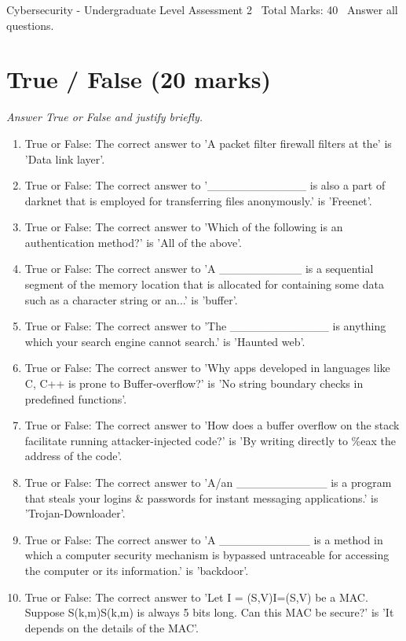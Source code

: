 \documentclass[12pt]{article}
\begin{document}
\begin{center}
Cybersecurity - Undergraduate Level Assessment 2 \
Total Marks: 40 \
Answer all questions.
\end{center}

\section*{True / False (20 marks)}
\textit{Answer True or False and justify briefly.}
\begin{enumerate}[label=\arabic*.]
\item True or False: The correct answer to 'A packet filter firewall filters at the' is 'Data link layer'.
\item True or False: The correct answer to '\_\_\_\_\_\_\_\_\_\_\_\_ is also a part of darknet that is employed for transferring files anonymously.' is 'Freenet'.
\item True or False: The correct answer to 'Which of the following is an authentication method?' is 'All of the above'.
\item True or False: The correct answer to 'A \_\_\_\_\_\_\_\_\_\_ is a sequential segment of the memory location that is allocated for containing some data such as a character string or an...' is 'buffer'.
\item True or False: The correct answer to 'The \_\_\_\_\_\_\_\_\_\_\_\_ is anything which your search engine cannot search.' is 'Haunted web'.
\item True or False: The correct answer to 'Why apps developed in languages like C, C++ is prone to Buffer-overflow?' is 'No string boundary checks in predefined functions'.
\item True or False: The correct answer to 'How does a buffer overflow on the stack facilitate running attacker-injected code?' is 'By writing directly to \%eax the address of the code'.
\item True or False: The correct answer to 'A/an \_\_\_\_\_\_\_\_\_\_\_ is a program that steals your logins \& passwords for instant messaging applications.' is 'Trojan-Downloader'.
\item True or False: The correct answer to 'A \_\_\_\_\_\_\_\_\_\_\_ is a method in which a computer security mechanism is bypassed untraceable for accessing the computer or its information.' is 'backdoor'.
\item True or False: The correct answer to 'Let I = (S,V)I=(S,V) be a MAC. Suppose S(k,m)S(k,m) is always 5 bits long. Can this MAC be secure?' is 'It depends on the details of the MAC'.
\end{enumerate}
\end{document}
